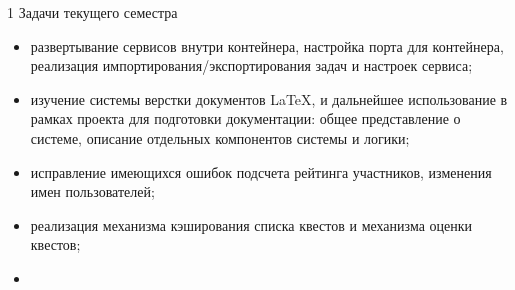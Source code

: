 \begin{center}
1 Задачи текущего семестра
\end{center}

\vspace{\baselineskip}

\begin{itemize}
\item развертывание сервисов внутри контейнера, настройка порта для контейнера, реализация импортирования/экспортирования задач и настроек сервиса;
\item изучение системы верстки документов \LaTeX , и дальнейшее использование в рамках проекта для подготовки документации: общее представление о системе, описание отдельных компонентов системы и логики;
\item исправление имеющихся ошибок подсчета рейтинга участников, изменения имен пользователей;
\item реализация механизма кэширования списка квестов и механизма оценки квестов;
\item 

\end{itemize}

\clearpage
